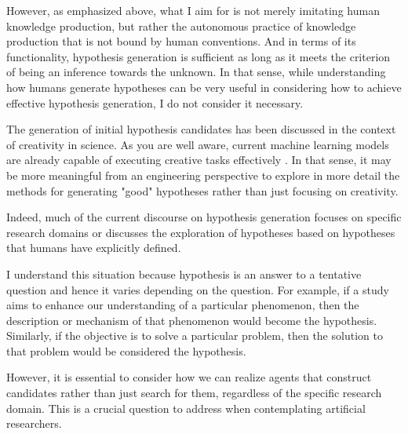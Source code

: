 \documentclass{book}
\begin{document}
However, as emphasized above, what I aim for is not merely imitating human knowledge production, but rather the autonomous practice of knowledge production that is not bound by human conventions. And in terms of its functionality, hypothesis generation is sufficient as long as it meets the criterion of being an inference towards the unknown. In that sense, while understanding how humans generate hypotheses can be very useful in considering how to achieve effective hypothesis generation, I do not consider it necessary.

The generation of initial hypothesis candidates has been discussed in the context of creativity in science. As you are well aware, current machine learning models are already capable of executing creative tasks effectively \cite{sep-creativity}. In that sense, it may be more meaningful from an engineering perspective to explore in more detail the methods for generating "good" hypotheses rather than just focusing on creativity. 

Indeed, much of the current discourse on hypothesis generation focuses on specific research domains or discusses the exploration of hypotheses based on hypotheses that humans have explicitly defined. 

I understand this situation because hypothesis is an answer to a tentative question and hence it varies depending on the question. For example, if a study aims to enhance our understanding of a particular phenomenon, then the description or mechanism of that phenomenon would become the hypothesis. Similarly, if the objective is to solve a particular problem, then the solution to that problem would be considered the hypothesis. 

However, it is essential to consider how we can realize agents that construct candidates rather than just search for them, regardless of the specific research domain. This is a crucial question to address when contemplating artificial researchers.



\end{document}
